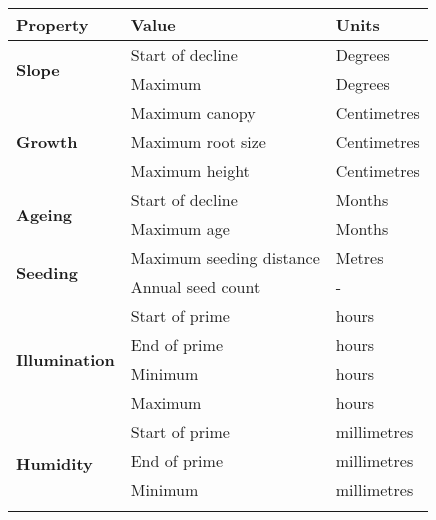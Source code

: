 \begin{table}[]
  \centering
	    \begin{tabular}{|p{4cm}|p{7cm}|p{2cm}|}
		\hline	
		\textbf{Property} & \textbf{Value} & \textbf{Units} \\
		\hline
		\multirow{2}{*}{\textbf{Slope}} & \multicolumn{1}{l|}{Start of decline} & \multicolumn{1}{l|}{Degrees} \\\cline{2-3}
        						   & \multicolumn{1}{l|}{Maximum} & \multicolumn{1}{l|}{Degrees} \\
		\hline
		\multirow{3}{*}{\textbf{Growth}} & \multicolumn{1}{l|}{Maximum canopy} & \multicolumn{1}{l|}{Centimetres} \\\cline{2-3}
        						   & \multicolumn{1}{l|}{Maximum root size} & \multicolumn{1}{l|}{Centimetres} \\\cline{2-3}
                               & \multicolumn{1}{l|}{Maximum height} & \multicolumn{1}{l|}{Centimetres} \\
		\hline
		\multirow{2}{*}{\textbf{Ageing}} & \multicolumn{1}{l|}{Start of decline} & \multicolumn{1}{l|}{Months} \\\cline{2-3}
        						   & \multicolumn{1}{l|}{Maximum age} & \multicolumn{1}{l|}{Months} \\
		\hline    
		\multirow{2}{*}{\textbf{Seeding}} & \multicolumn{1}{l|}{Maximum seeding distance} & \multicolumn{1}{l|}{Metres} \\\cline{2-3}
        						   & \multicolumn{1}{l|}{Annual seed count} & \multicolumn{1}{l|}{ - } \\
		\hline    
		\multirow{4}{*}{\textbf{Illumination}}
								& \multicolumn{1}{l|}{Start of prime} & \multicolumn{1}{l|}{hours} \\\cline{2-3}
								& \multicolumn{1}{l|}{End of prime} & \multicolumn{1}{l|}{hours} \\\cline{2-3}
								& \multicolumn{1}{l|}{Minimum} & \multicolumn{1}{l|}{hours} \\\cline{2-3}
								& \multicolumn{1}{l|}{Maximum} & \multicolumn{1}{l|}{hours} \\
		\hline   
		\multirow{4}{*}{\textbf{Humidity}}
								& \multicolumn{1}{l|}{Start of prime} & \multicolumn{1}{l|}{millimetres} \\\cline{2-3}
								& \multicolumn{1}{l|}{End of prime} & \multicolumn{1}{l|}{millimetres} \\\cline{2-3}
								& \multicolumn{1}{l|}{Minimum} & \multicolumn{1}{l|}{millimetres} \\\cline{2-3}

\end{tabular}
\end{table}
